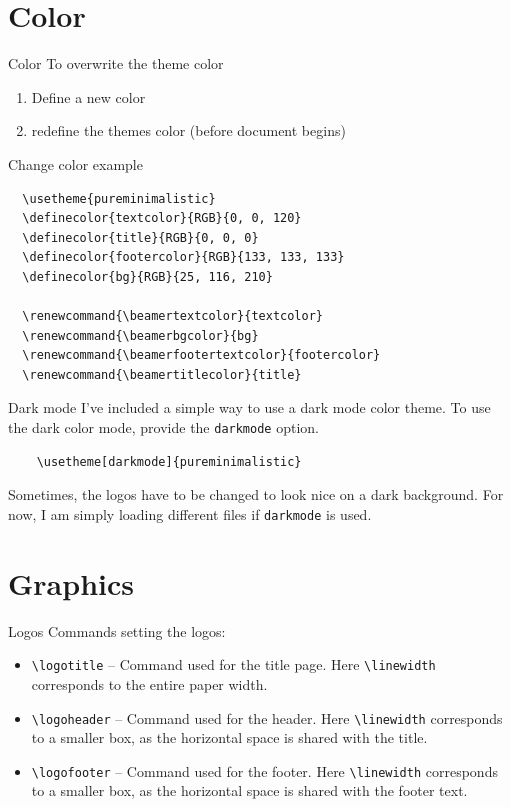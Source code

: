 \documentclass[aspectratio=169]{beamer}                    %
\begin{document}
\section{Color}
\begin{frame}[fragile]{Color}
    To overwrite the theme color
    \begin{enumerate}
        \item Define a new color
        \item redefine the themes color (before document begins)
    \end{enumerate}
\end{frame}

\begin{frame}[fragile]{Change color example}
    \small
    \begin{verbatim}
  \usetheme{pureminimalistic}
  \definecolor{textcolor}{RGB}{0, 0, 120}
  \definecolor{title}{RGB}{0, 0, 0}
  \definecolor{footercolor}{RGB}{133, 133, 133}
  \definecolor{bg}{RGB}{25, 116, 210}

  \renewcommand{\beamertextcolor}{textcolor}
  \renewcommand{\beamerbgcolor}{bg}
  \renewcommand{\beamerfootertextcolor}{footercolor}
  \renewcommand{\beamertitlecolor}{title}
  \end{verbatim}
\end{frame}

\begin{frame}[fragile]{Dark mode}
    I've included a simple way to use a dark mode
    color theme. To use the dark color mode, provide the \texttt{darkmode}
    option.
    \begin{verbatim}
    \usetheme[darkmode]{pureminimalistic}
    \end{verbatim}
    Sometimes, the logos have to be changed to look nice on a
    dark background. For now, I am simply loading different
    files if \texttt{darkmode} is used.
\end{frame}

\section{Graphics}
\begin{frame}{Logos}
    Commands setting the logos:
    \begin{itemize}
        \item \texttt{\textbackslash{}logotitle} -- Command used for the title page.
              Here \texttt{\textbackslash{}linewidth} corresponds to the entire paper width.
        \item \texttt{\textbackslash{}logoheader} -- Command used for the header.
              Here \texttt{\textbackslash{}linewidth} corresponds to a smaller box,
              as the horizontal space is shared with the title.
        \item \texttt{\textbackslash{}logofooter} -- Command used for the footer.
              Here \texttt{\textbackslash{}linewidth} corresponds to a smaller box,
              as the horizontal space is shared with the footer text.
    \end{itemize}
\end{frame}
\end{document}
